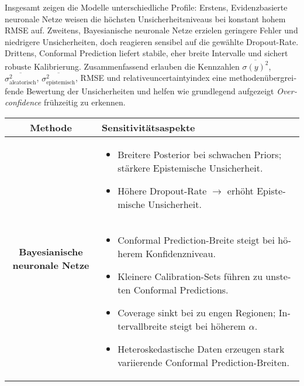 \begin{otherlanguage}{ngerman}
Insgesamt zeigen die Modelle unterschiedliche Profile: Erstens, \gls{Evidenzbasierte neuronale Netze} weisen die höchsten Unsicherheitsniveaus bei konstant hohem RMSE auf. Zweitens, \gls{Bayesianische neuronale Netze} erzielen geringere Fehler und niedrigere Unsicherheiten, doch reagieren sensibel auf die gewählte Dropout-Rate. Drittens, \gls{Conformal Prediction} liefert stabile, eher breite Intervalle und sichert robuste Kalibrierung. Zusammenfassend erlauben die Kennzahlen \(\overline{\sigma(y)^2}\), \(\overline{\sigma_{\text{aleatorisch}}^2}\), \(\overline{\sigma_{\text{epistemisch}}^2}\), RMSE und \gls{relativeuncertaintyindex} eine methodenübergreifende Bewertung der Unsicherheiten und helfen wie grundlegend aufgezeigt \textit{Overconfidence} frühzeitig zu erkennen.



\begin{table}[!htbp]
\centering
\footnotesize
\begin{tabularx}{\textwidth}{|c|X|}
\hline
\textbf{Methode} & \hspace{0.5em}\textbf{Sensitivitätsaspekte} \\
\hline

\multirow{4}{*}{\centering \textbf{\gls{Bayesianische neuronale Netze}}} &
\begin{itemize}[topsep=0em, itemsep=0em, leftmargin=*, label={}]
    \item Breitere Posterior bei schwachen Priors; stärkere \gls{Epistemische Unsicherheit}.
    \item Höhere Dropout-Rate \(\rightarrow\) erhöht \gls{Epistemische Unsicherheit}.
\end{itemize}
\\
\hline

\multirow{6}{*}{\centering \textbf{\gls{Conformal Prediction}}} &
\begin{itemize}[topsep=0em, itemsep=0em, leftmargin=*, label={}]
    \item \gls{Conformal Prediction}-Breite steigt bei höherem Konfidenzniveau.
    \item Kleinere Calibration-Sets führen zu unsteten \gls{Conformal Prediction}s.
    \item Coverage sinkt bei zu engen Regionen; Intervallbreite steigt bei höherem \(\alpha\).
    \item Heteroskedastische Daten erzeugen stark variierende \gls{Conformal Prediction}-Breiten.
\end{itemize}
\\
\hline


\end{tabularx}
\end{table}
\end{otherlanguage}
